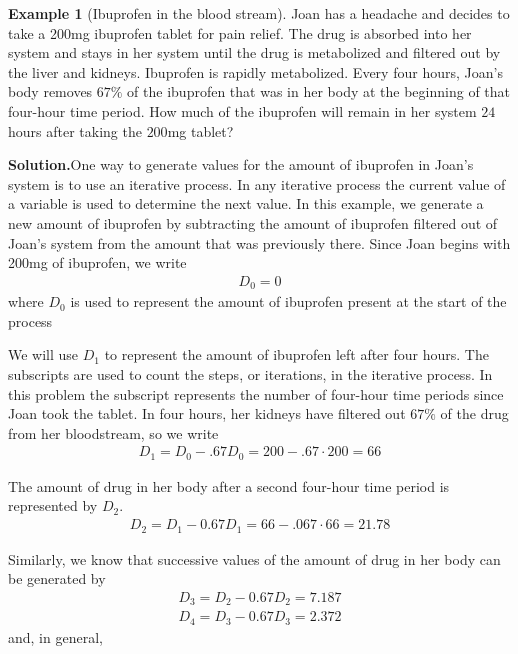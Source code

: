 \documentclass[10pt,]{book}
\theoremstyle{plain}
\theoremstyle{definition}
\theoremstyle{definition}
\newtheorem{example}[theorem]{Example}
\theoremstyle{definition}
\numberwithin{equation}{section}
\begin{document}
\begin{example}[Ibuprofen in the blood stream]\label{ibuprofen-example-one-dose}
Joan has a headache and decides to take a 200mg ibuprofen tablet for pain relief.  The drug is absorbed into her system and stays in her system until the drug is metabolized and filtered out by the liver and kidneys.  Ibuprofen is rapidly metabolized.  Every four hours, Joan's body removes \(67\%\) of the ibuprofen that was in her body at the beginning of that four-hour time period.  How much of the ibuprofen will remain in her system \(24\) hours after taking the \(200\)mg tablet?%
\par\medskip\noindent%
\textbf{Solution.}\quad One way to generate values for the amount of ibuprofen in Joan's system is to use an iterative process.  In any iterative process the current value of a variable is used to determine the next value.  In this example, we generate a new amount of ibuprofen by subtracting the amount of ibuprofen filtered out of Joan's system from the amount that was previously there.  Since Joan begins with 200mg of ibuprofen, we write%
\begin{gather*}
D_0=0
\end{gather*}
where \(D_0\) is used to represent the amount of ibuprofen present at the start of the process%
\par
We will use \(D_1\) to represent the amount of ibuprofen left after four hours.  The subscripts are used to count the steps, or iterations,  in the iterative process. In this problem the subscript  represents the number of four-hour time periods since Joan took the tablet.  In four hours, her kidneys have filtered out \(67\%\) of the drug from her bloodstream, so we write%
\begin{gather*}
D_1=D_0-.67D_0=200-.67\cdot 200=66
\end{gather*}
%
\par
The amount of drug in her body after a second four-hour time period is represented by \(D_2\).%
\begin{gather*}
D_2=D_1-0.67D_1=66-.067\cdot 66=21.78
\end{gather*}
%
\par
Similarly, we know that successive values of the amount of drug in her body can be generated by%
\begin{gather*}
D_3=D_2-0.67D_2=7.187\\
D_4=D_3-0.67D_3=2.372
\end{gather*}
and, in general,%
\begin{gather*}

\end{gather*}
\end{example}
\end{document}
